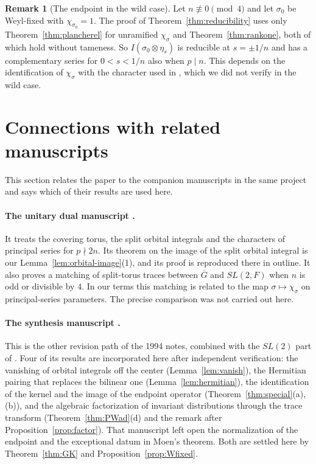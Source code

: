 \documentclass[12pt,letterpaper]{article}
\numberwithin{equation}{section}
\theoremstyle{definition}
\newtheorem{remark}[theorem]{Remark}
\newcommand{\bG}{\overline{G}}
\begin{document}
\begin{remark}[The endpoint in the wild case]\label{rem:wild-endpoint}
Let $n\not\equiv0\pmod4$ and let $\sigma_0$ be Weyl-fixed with $\chi_{\sigma_0}=1$.  The proof
of Theorem~\ref{thm:reducibility} uses only Theorem~\ref{thm:plancherel} for unramified
$\chi_\sigma$ and Theorem~\ref{thm:rankone}, both of which hold without tameness.  So
$I(\sigma_0\otimes\eta_s)$ is reducible at $s=\pm1/n$ and has a complementary series for
$0<s<1/n$ also when $p\mid n$.  This depends on the identification of $\chi_\sigma$ with
the character used in \cite{Sz19}, which we did not verify in the wild case.
\end{remark}

\section{Connections with related manuscripts}\label{sec:connections}

This section relates the paper to the companion manuscripts in the same project and
says which of their results are used here.

\paragraph{The unitary dual manuscript \cite{JoUD}.}  It treats the covering torus, the
split orbital integrals and the characters of principal series for $p\nmid2n$.  Its
theorem on the image of the split orbital integral is our Lemma~\ref{lem:orbital-image}(1),
and its proof is reproduced there in outline.  It also proves a matching of split-torus
traces between $\bG$ and $SL(2,F)$ when $n$ is odd or divisible by $4$.  In our terms this
matching is related to the map $\sigma\mapsto\chi_\sigma$ on principal-series parameters.
The precise comparison was not carried out here.

\paragraph{The synthesis manuscript \cite{JoSyn}.}  This is the other revision path of
the 1994 notes, combined with the $SL(2)$ part of \cite{Jo01}.  Four of its results are
incorporated here after independent verification: the vanishing of orbital integrals off
the center (Lemma~\ref{lem:vanish}), the Hermitian pairing that replaces the bilinear one
(Lemma~\ref{lem:hermitian}), the identification of the kernel and the image of the
endpoint operator (Theorem~\ref{thm:special}(a),(b)), and the algebraic factorization of
invariant distributions through the trace transform (Theorem~\ref{thm:PWad}(d) and the
remark after Proposition~\ref{prop:factor}).  That manuscript left open the normalization
of the endpoint and the exceptional datum in Moen's theorem.  Both are settled here by
Theorem~\ref{thm:GK} and Proposition~\ref{prop:Wfixed}.
\end{document}
